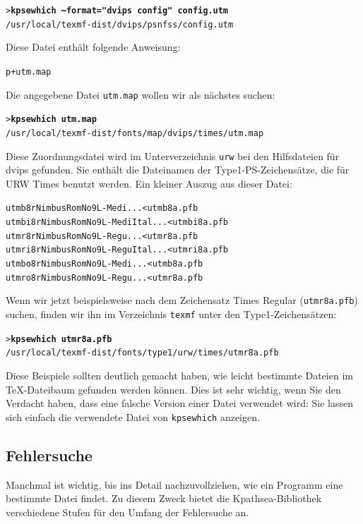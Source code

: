\documentclass[12pt,ngerman,a4paper,fullparskip]{report}
\newcommand{\cmdname}[1]{\texttt{#1}}
\newcommand{\OnCD}[1]{\texttt{#1}}
\newcommand{\file}[1]{\texttt{#1}}
\newcommand{\KPS}{Kpathsea\xspace}
\newcommand{\Ucom}[1]{\textbf{\texttt{#1}}}
\begin{document}
\begin{alltt}
> \Ucom{kpsewhich --format="dvips config" config.utm}
   /usr/local/texmf-dist/dvips/psnfss/config.utm
\end{alltt}

Diese Datei enthält folgende Anweisung:

\begin{alltt}
   p +utm.map
\end{alltt}

Die angegebene Datei \file{utm.map} wollen wir als nächstes suchen:

\begin{alltt}
> \Ucom{kpsewhich utm.map}
   /usr/local/texmf-dist/fonts/map/dvips/times/utm.map
\end{alltt}

Diese Zuordnungsdatei wird im Unterverzeichnis \file{urw} bei den
Hilfsdateien für dvips gefunden. Sie enthält die Dateinamen der
Type1-PS-Zeichensätze, die für URW Times benutzt werden. Ein
kleiner Auszug aus dieser Datei:

\begin{alltt}
  utmb8r  NimbusRomNo9L-Medi    ... <utmb8a.pfb
  utmbi8r NimbusRomNo9L-MediItal... <utmbi8a.pfb
  utmr8r  NimbusRomNo9L-Regu    ... <utmr8a.pfb
  utmri8r NimbusRomNo9L-ReguItal... <utmri8a.pfb
  utmbo8r NimbusRomNo9L-Medi    ... <utmb8a.pfb
  utmro8r NimbusRomNo9L-Regu    ... <utmr8a.pfb
\end{alltt}

Wenn wir jetzt beispielsweise nach dem Zeichensatz Times Regular
(\file{utmr8a.pfb}) suchen, finden wir ihn im
Verzeichnis \OnCD{texmf} unter den Type1-Zeichensätzen:

\begin{alltt}
> \Ucom{kpsewhich utmr8a.pfb}
 /usr/local/texmf-dist/fonts/type1/urw/times/utmr8a.pfb
\end{alltt}

Diese Beispiele sollten deutlich gemacht haben, wie leicht bestimmte Dateien
im \TeX-Dateibaum gefunden werden können. Dies ist sehr wichtig, wenn Sie
den Verdacht haben, dass eine falsche Version einer Datei verwendet wird:
Sie lassen sich einfach die verwendete Datei von \cmdname{kpsewhich}
anzeigen.

\subsection{Fehlersuche}
\label{sec:debugging}

Manchmal ist wichtig, bis ins Detail nachzuvollziehen, wie ein Programm eine
bestimmte Datei findet. Zu diesem Zweck bietet die \KPS-Bibliothek verschiedene
Stufen für den Umfang der Fehlersuche an.
\end{document}
